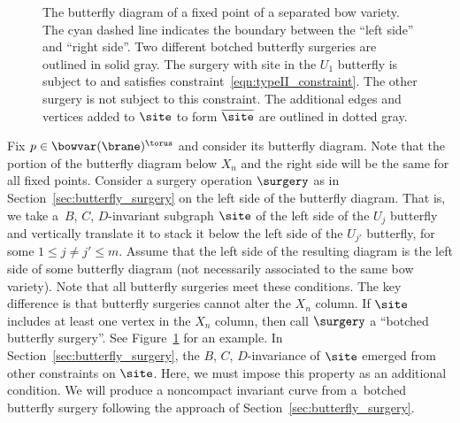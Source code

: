 \begin{figure}[th!]

\caption{The butterfly diagram of a fixed point of a separated bow variety. The cyan dashed line indicates the boundary between the ``left side'' and ``right side''. Two different botched butterfly surgeries are outlined in solid gray. The surgery with site in the $U_1$ butterfly is subject to and satisfies constraint~\eqref{eqn:typeII_constraint}. The other surgery is not subject to this constraint. The additional edges and vertices added to $\site$ to form $\overline\site$ are outlined in dotted gray.}
\label{fig:butterfly_sides}\vspace{-2mm}
\end{figure}

Fix $p\in \bowvar(\brane)^\torus$ and consider its butterfly diagram. Note that the portion of the butterfly diagram below $X_n$ and the right side will be the same for all fixed points. Consider a surgery operation $\surgery$ as in Section~\ref{sec:butterfly_surgery} on the left side of the butterfly diagram. That is, we take a~$B$, $C$, $D$-invariant subgraph $\site$ of the left side of the $U_j$ butterfly and vertically translate it to stack it below the left side of the $U_{j'}$ butterfly, for some $1\leq j\neq j' \leq m$. Assume that the left side of the resulting diagram is the left side of some butterfly diagram (not necessarily associated to the same bow variety). Note that all butterfly surgeries meet these conditions. The key difference is that butterfly surgeries cannot alter the $X_n$ column. If $\site$ includes at least one vertex in the $X_n$ column, then call $\surgery$ a ``botched butterfly surgery''. See Figure~\ref{fig:butterfly_sides} for an example. In Section~\ref{sec:butterfly_surgery}, the $B$, $C$, $D$-invariance of $\site$ emerged from other constraints on $\site$. Here, we must impose this property as an additional condition. We will produce a noncompact invariant curve from a~botched butterfly surgery following the approach of Section~\ref{sec:butterfly_surgery}.

